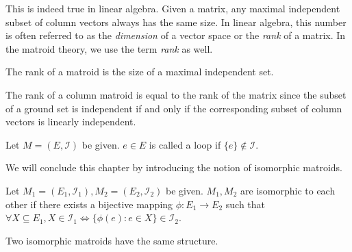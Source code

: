 This is indeed true in linear algebra.
Given a matrix, any maximal independent subset of column vectors always has the same size. 
In linear algebra, this number is often referred to as the \textit{dimension} of a vector space or the \textit{rank} of a matrix.
In the matroid theory, we use the term \textit{rank} as well.


\begin{defn}
The rank of a matroid is the size of a maximal independent set.
\end{defn}

The rank of a column matroid is equal to the rank of the matrix since the subset of a ground set is independent if and only if the corresponding subset of column vectors is linearly independent.

\begin{defn}
Let $M = (E, \mathcal{I})$ be given.
$e \in E$ is called a loop if $\{ e \} \notin \mathcal{I}$.
\end{defn}

We will conclude this chapter by introducing the notion of isomorphic matroids.
\begin{defn}
Let $M_1 = (E_1, \mathcal{I}_1), M_2 = (E_2, \mathcal{I}_2)$ be given.
$M_1, M_2$ are isomorphic to each other if there exists a bijective mapping $\phi: E_1 \rightarrow E_2$ such that
$\forall X \subseteq E_1, X \in \mathcal{I}_1 \iff \{ \phi(e) : e \in X \} \in \mathcal{I}_2$.
\end{defn}

Two isomorphic matroids have the same structure.
